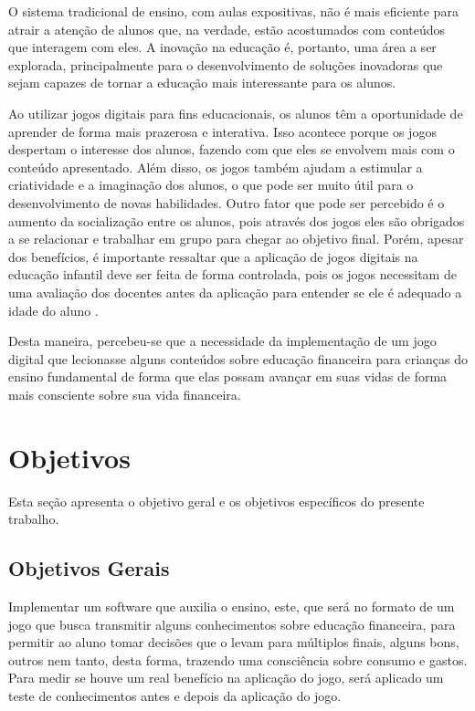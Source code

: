         O sistema tradicional de ensino, com aulas expositivas, não é mais eficiente para atrair a atenção de alunos
        que, na verdade, estão acostumados com conteúdos que interagem com eles. A inovação na educação é, portanto, uma
        área a ser explorada, principalmente para o desenvolvimento de soluções inovadoras que sejam capazes de tornar a
        educação mais interessante para os alunos.

        Ao utilizar jogos digitais para fins educacionais, os alunos têm a oportunidade de aprender de forma mais
        prazerosa e interativa. Isso acontece porque os jogos despertam o interesse dos alunos, fazendo com que eles se
        envolvem mais com o conteúdo apresentado. Além disso, os jogos também ajudam a estimular a criatividade e a
        imaginação dos alunos, o que pode ser muito útil para o desenvolvimento de novas habilidades.  Outro fator que
        pode ser percebido é o aumento da socialização entre os alunos, pois através dos jogos eles são obrigados a se
        relacionar e trabalhar em grupo para chegar ao objetivo final. Porém, apesar dos benefícios, é importante
        ressaltar que a aplicação de jogos digitais na educação infantil deve ser feita de forma controlada, pois os
        jogos necessitam de uma avaliação dos docentes antes da aplicação para entender se ele é adequado a idade do
        aluno \cite{Cruz_Araujo_Andrye_Galvao_Madeira_2022}.

        Desta maneira, percebeu-se que a necessidade da implementação de um jogo digital que lecionasse alguns
        conteúdos sobre educação financeira para crianças do ensino fundamental de forma que elas possam avançar em suas
        vidas de forma mais consciente sobre sua vida financeira.

    \section{Objetivos}

        Esta seção apresenta o objetivo geral e os objetivos específicos do presente trabalho.

        \subsection{Objetivos Gerais}

            Implementar um software que auxilia o ensino, este,  que será no formato de um jogo que busca transmitir
            alguns conhecimentos sobre educação financeira, para permitir ao aluno tomar decisões que o levam para
            múltiplos finais, alguns bons, outros nem tanto, desta forma, trazendo uma consciência sobre consumo e gastos.
            Para medir se houve um real benefício na aplicação do jogo, será aplicado um teste de conhecimentos antes e
            depois da aplicação do jogo.

